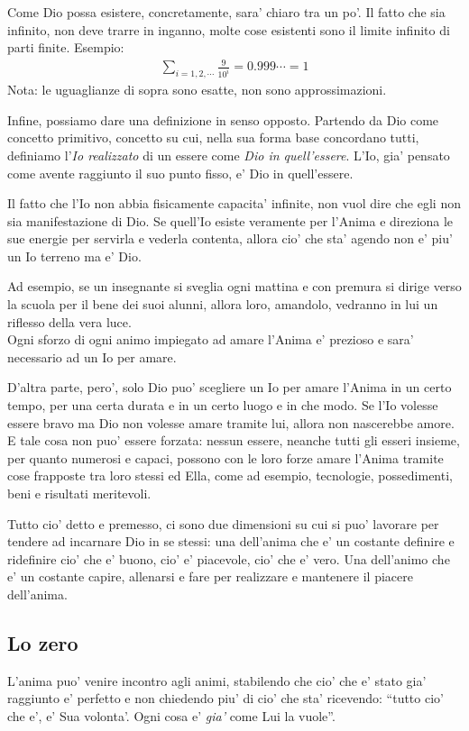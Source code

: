 Come Dio possa esistere, concretamente, sara' chiaro tra un po'. Il fatto che sia infinito, non deve trarre in inganno, molte cose esistenti sono il limite infinito di parti finite. Esempio: 
\begin{align*} 
\sum_{i=1,2,\cdots} \frac{9}{10^i} = 0.999\cdots = 1
\end{align*}
Nota: le uguaglianze di sopra sono esatte, non sono approssimazioni.

Infine, possiamo dare una definizione in senso opposto. Partendo da Dio come concetto primitivo, concetto su cui, nella sua forma base concordano tutti, definiamo l'\emph{Io realizzato} di un essere come \emph{Dio in quell'essere}. L'Io, gia' pensato come avente raggiunto il suo punto fisso, e' Dio in quell'essere.

Il fatto che l'Io non abbia fisicamente capacita' infinite, non vuol dire che egli non sia manifestazione di Dio. Se quell'Io esiste veramente per l'Anima e direziona le sue energie per servirla e vederla contenta, allora cio' che sta' agendo non e' piu' un Io terreno ma e' Dio.

Ad esempio, se un insegnante si sveglia ogni mattina e con premura si dirige verso la scuola per il bene dei suoi alunni, allora loro, amandolo, vedranno in lui un riflesso della vera luce.\\


Ogni sforzo di ogni animo impiegato ad amare l'Anima e' prezioso e sara' necessario ad un Io per amare. 

D'altra parte, pero', solo Dio puo' scegliere un Io per amare l'Anima in un certo tempo, per una certa durata e in un certo luogo e in che modo. Se l'Io volesse essere bravo ma Dio non volesse amare tramite lui, allora non nascerebbe amore. E tale cosa non puo' essere forzata: nessun essere, neanche tutti gli esseri insieme, per quanto numerosi e capaci, possono con le loro forze amare l'Anima tramite cose frapposte tra loro stessi ed Ella, come ad esempio, tecnologie, possedimenti, beni e risultati meritevoli. 

Tutto cio' detto e premesso, ci sono due dimensioni su cui si puo' lavorare per tendere ad incarnare Dio in se stessi: una dell'anima che e' un costante definire e ridefinire cio' che e' buono, cio' e' piacevole, cio' che e' vero. Una dell'animo che e' un costante capire, allenarsi e fare per realizzare e mantenere il piacere dell'anima.

\subsection{Lo zero}
\label{loZero}
L'anima puo' venire incontro agli animi, stabilendo che cio' che e' stato gia' raggiunto e' perfetto e non chiedendo piu' di cio' che sta' ricevendo: ``tutto cio' che e', e' Sua volonta'. Ogni cosa e' \emph{gia'} come Lui la vuole''.

